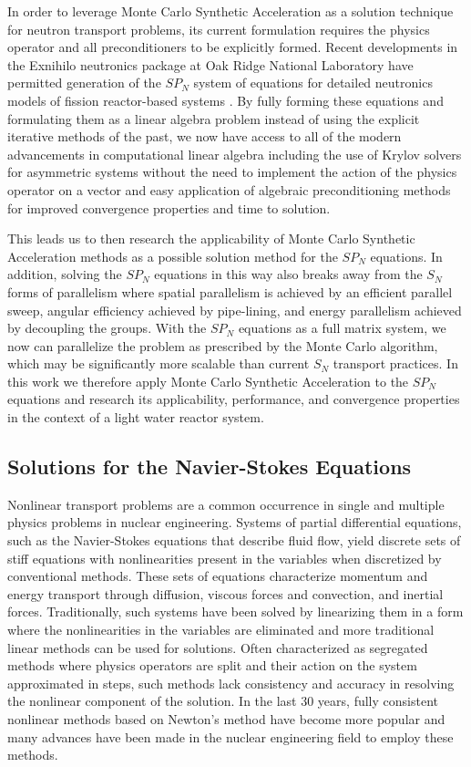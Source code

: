In order to leverage Monte Carlo Synthetic Acceleration as a solution
technique for neutron transport problems, its current formulation
requires the physics operator and all preconditioners to be explicitly
formed. Recent developments in the Exnihilo neutronics package at Oak
Ridge National Laboratory have permitted generation of the $SP_N$
system of equations for detailed neutronics models of fission
reactor-based systems \cite{evans_simplified_2013}. By fully forming
these equations and formulating them as a linear algebra problem
instead of using the explicit iterative methods of the past, we now
have access to all of the modern advancements in computational linear
algebra including the use of Krylov solvers for asymmetric systems
without the need to implement the action of the physics operator on a
vector and easy application of algebraic preconditioning methods for
improved convergence properties and time to solution.

This leads us to then research the applicability of Monte Carlo
Synthetic Acceleration methods as a possible solution method for the
$SP_N$ equations. In addition, solving the $SP_N$ equations in this
way also breaks away from the $S_N$ forms of parallelism where spatial
parallelism is achieved by an efficient parallel sweep, angular
efficiency achieved by pipe-lining, and energy parallelism achieved by
decoupling the groups. With the $SP_N$ equations as a full matrix
system, we now can parallelize the problem as prescribed by the Monte
Carlo algorithm, which may be significantly more scalable than current
$S_N$ transport practices. In this work we therefore apply Monte Carlo
Synthetic Acceleration to the $SP_N$ equations and research its
applicability, performance, and convergence properties in the context
of a light water reactor system.

\subsection{Solutions for the Navier-Stokes Equations}
\label{subsec:ns_motiviation}

Nonlinear transport problems are a common occurrence in single and
multiple physics problems in nuclear engineering. Systems of partial
differential equations, such as the Navier-Stokes equations that
describe fluid flow, yield discrete sets of stiff equations with
nonlinearities present in the variables when discretized by
conventional methods. These sets of equations characterize momentum
and energy transport through diffusion, viscous forces and convection,
and inertial forces. Traditionally, such systems have been solved by
linearizing them in a form where the nonlinearities in the variables
are eliminated and more traditional linear methods can be used for
solutions. Often characterized as segregated methods where physics
operators are split and their action on the system approximated in
steps, such methods lack consistency and accuracy in resolving the
nonlinear component of the solution. In the last 30 years, fully
consistent nonlinear methods based on Newton's method have become more
popular and many advances have been made in the nuclear engineering
field to employ these methods.

